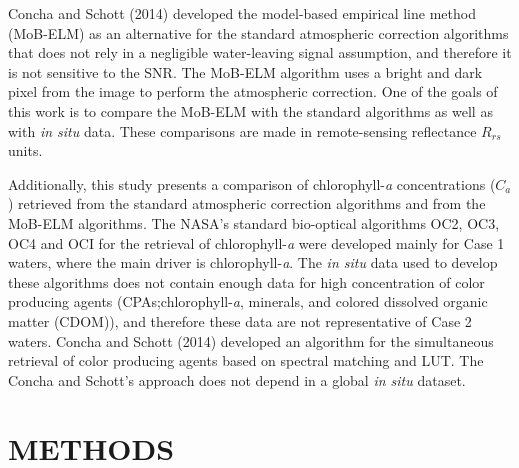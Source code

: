 \documentclass[draft]{spie}  %
\begin{document}
Concha and Schott (2014)\cite{Concha2014SPIE} developed the model-based empirical line method (MoB-ELM) as an alternative for the standard atmospheric correction algorithms that does not rely in a negligible water-leaving signal assumption, and therefore it is not sensitive to the SNR. The MoB-ELM algorithm uses a bright and dark pixel from the image to perform the atmospheric correction. One of the goals of this work is to compare the MoB-ELM with the standard algorithms as well as with {\it in situ} data. These comparisons are made in remote-sensing reflectance $R_{rs}$ units. 

Additionally, this study presents a comparison of chlorophyll-{\it a} concentrations ($C_a$) retrieved from the standard atmospheric correction algorithms and from the MoB-ELM algorithms. The NASA's standard bio-optical algorithms OC2, OC3, OC4\cite{OReilly2000} and OCI\cite{Hu:2012} for the retrieval of chlorophyll-{\it a} were developed mainly for Case 1 waters, where the main driver is chlorophyll-{\it a}. The {\it in situ} data used to develop these algorithms does not contain enough data for high concentration of color producing agents (CPAs;chlorophyll-{\it a}, minerals, and colored dissolved organic matter (CDOM)), and therefore these data are not representative of Case 2 waters. Concha and Schott (2014)\cite{Concha2013IGARSS} developed an algorithm for the simultaneous retrieval of color producing agents based on spectral matching and LUT. The Concha and Schott's approach does not depend in a global {\it in situ} dataset.

\section{METHODS}
\label{sec:methods}
\end{document}
